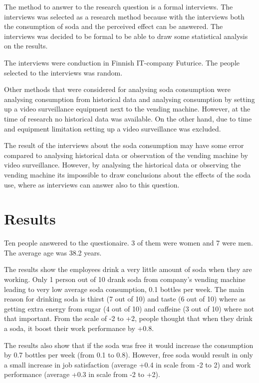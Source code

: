 \documentclass[a4paper]{article}
\begin{document}
The method to answer to the research question is a formal interviews. The interviews was selected as a research method because with the interviews both the consumption of soda and the perceived effect can be answered. The interviews was decided to be formal to be able to draw some statistical analysis on the results.

The interviews were conduction in Finnish IT-company Futurice. The people selected to the interviews was random. 

Other methods that were considered for analysing soda consumption were analysing consumption from historical data and analysing consumption by setting up a video surveillance equipment next to the vending machine. However, at the time of research no historical data was available. On the other hand, due to time and equipment limitation setting up a video surveillance was excluded.

The result of the interviews about the soda consumption may have some error compared to analysing historical data or observation of the vending machine by video surveillance. However, by analysing the historical data or observing the vending machine its impossible to draw conclusions about the effects of the soda use, where as interviews can answer also to this question.

\section{Results}

Ten people answered to the questionaire. 3 of them were women and 7 were men. The average age was 38.2 years.

The results show the employees drink a very little amount of soda when they are working. Only 1 person out of 10 drank soda from company's vending machine leading to very low average soda consumption, 0.1 bottles per week. The main reason for drinking soda is thirst (7 out of 10) and taste (6 out of 10) where as getting extra energy from sugar (4 out of 10) and caffeine (3 out of 10) where not that important. From the scale of -2 to +2, people thought that when they drink a soda, it boost their work performance by +0.8.

The results also show that if the soda was free it would increase the consumption by 0.7 bottles per week (from 0.1 to 0.8). However, free soda would result in only a small increase in job satisfaction (average +0.4 in scale from -2 to 2) and work performance (average +0.3 in scale from -2 to +2).
\end{document}
